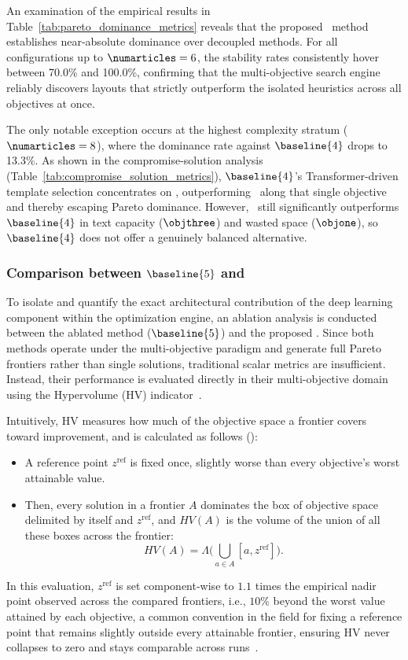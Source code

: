 An examination of the empirical results in Table~\ref{tab:pareto_dominance_metrics} reveals that the proposed \methodNameUniform\ method establishes near-absolute dominance over decoupled methods. For all configurations up to $\numarticles = 6$, the stability rates consistently hover between 70.0\% and 100.0\%,  confirming that the multi-objective search engine reliably discovers layouts that strictly outperform the isolated heuristics across all objectives at once.

The only notable exception occurs at the highest complexity stratum ($\numarticles = 8$), where the dominance rate against $\baseline{4}$ drops to 13.3\%. As shown in the compromise-solution analysis (Table~\ref{tab:compromise_solution_metrics}), $\baseline{4}$'s Transformer-driven template selection concentrates on \objtwo, outperforming \methodNameUniform\ along that single objective and thereby escaping Pareto dominance. However, \methodNameUniform\ still significantly outperforms $\baseline{4}$ in text capacity ($\objthree$) and wasted space ($\objone$), so $\baseline{4}$ does not offer a genuinely balanced alternative.

\subsubsection{Comparison between $\baseline{5}$ and \methodNameUniform}

To isolate and quantify the exact architectural contribution of the deep learning component within the optimization engine, an ablation analysis is conducted between the ablated method ($\baseline{5}$) and the proposed \methodNameUniform. Since both methods operate under the multi-objective paradigm and generate full Pareto frontiers rather than single solutions, traditional scalar metrics are insufficient. Instead, their performance is evaluated directly in their multi-objective domain using the Hypervolume (HV) indicator~\cite{hv}.

Intuitively, HV measures how much of the objective space a frontier covers toward improvement, and is calculated as follows ():
\begin{itemize}
  \item A reference point $z^{\text{ref}}$ is fixed once, slightly worse than every objective's worst attainable value.
  \item Then, every solution in a frontier $A$ dominates the box of objective space delimited by itself and $z^{\text{ref}}$, and $HV(A)$ is the volume of the union of all these boxes across the frontier: $$HV(A) = \Lambda\big(\bigcup_{a \in A} [a, z^{\text{ref}}]\big).$$
\end{itemize}
In this evaluation, $z^{\text{ref}}$ is set component-wise to $1.1$ times the empirical nadir point observed across the compared frontiers, i.e., $10\%$ beyond the worst value attained by each objective, a common convention in the field for fixing a reference point that remains slightly outside every attainable frontier, ensuring HV never collapses to zero and stays comparable across runs~\cite{ishibuchi-2018}.

